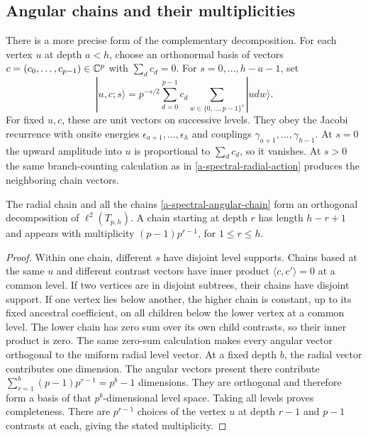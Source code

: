 \subsection{Angular chains and their multiplicities}

There is a more precise form of the complementary decomposition. For
each vertex $u$ at depth $a<h$, choose an orthonormal basis of vectors
$c=(c_0,\ldots,c_{p-1})\in\mathbb C^p$ with $\sum_dc_d=0$. For
$s=0,\ldots,h-a-1$, set
\begin{equation}
 |u,c;s\rangle
 =p^{-s/2}\sum_{d=0}^{p-1}c_d
       \sum_{w\in\{0,\ldots,p-1\}^{s}}|u d w\rangle.
 \label{a-spectral-angular-chain}
\end{equation}
For fixed $u,c$, these are unit vectors on successive levels. They obey
the Jacobi recurrence with onsite energies
$\epsilon_{a+1},\ldots,\epsilon_h$ and couplings
$\gamma_{a+1},\ldots,\gamma_{h-1}$. At $s=0$ the upward amplitude into
$u$ is proportional to $\sum_dc_d$, so it vanishes. At $s>0$ the same
branch-counting calculation as in \eqref{a-spectral-radial-action}
produces the neighboring chain vectors.

\begin{proposition}
\label{a-spectral-angular-completeness}
The radial chain and all the chains \eqref{a-spectral-angular-chain}
form an orthogonal decomposition of $\ell^2(T_{p,h})$. A chain starting
at depth $r$ has length $h-r+1$ and appears with multiplicity
$(p-1)p^{r-1}$, for $1\leq r\leq h$.
\end{proposition}
\begin{proof}
Within one chain, different $s$ have disjoint level supports. Chains
based at the same $u$ and different contrast vectors have inner product
$\langle c,c'\rangle=0$ at a common level. If two vertices are in disjoint
subtrees, their chains have disjoint support. If one vertex lies below
another, the higher chain is constant, up to its fixed ancestral
coefficient, on all children below the lower vertex at a common level.
The lower chain has zero sum over its own child contrasts, so their
inner product is zero. The same zero-sum calculation makes every
angular vector orthogonal to the uniform radial level vector.
At a fixed depth $b$, the radial vector contributes one dimension.
The angular vectors present there contribute
$\sum_{r=1}^b(p-1)p^{r-1}=p^b-1$ dimensions. They are orthogonal and
therefore form a basis of that $p^b$-dimensional level space. Taking
all levels proves completeness. There are $p^{r-1}$ choices of the
vertex $u$ at depth $r-1$ and $p-1$ contrasts at each, giving the
stated multiplicity.
\end{proof}

